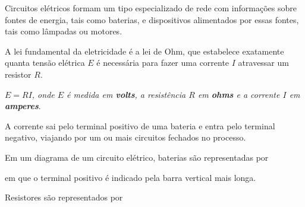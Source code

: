 \documentclass{beamer}
\begin{document}
    \begin{frame}
        Circuitos elétricos formam um tipo especializado de rede com informações sobre fontes de energia, \pause tais como baterias, \pause e dispositivos alimentados por essas fontes, tais como lâmpadas ou motores.\pause

        \vspace{1cm}

        A lei fundamental da eletricidade é a \textrm{lei de Ohm}, \pause que estabelece exatamente quanta tensão elétrica $E$ \pause é necessária para fazer uma corrente $I$ \pause atravessar um resistor $R$.\pause

        \vspace{1cm}
        \begin{tcolorbox}[colback=green!30, colframe=green!80!blue, title=Lei de Ohm]
            \textit{$E = RI$, \pause onde $E$ é medida em \textbf{volts}, \pause a resistência $R$ em \textbf{ohms} \pause e a corrente $I$ em \textbf{amperes}}.
        \end{tcolorbox}

    \end{frame}

    \begin{frame}

        A corrente sai pelo terminal positivo de uma bateria \pause e entra pelo terminal negativo, \pause viajando por um ou mais circuitos fechados no processo.\pause

        \vspace{1cm}

        Em um diagrama de um circuito elétrico, baterias são representadas por
        \begin{center}
        \end{center}\pause
        em que o terminal positivo é indicado pela barra vertical mais longa.\pause

        \vspace{1cm}

        Resistores são representados por
        \begin{center}
        \end{center}
    \end{frame}
\end{document}
